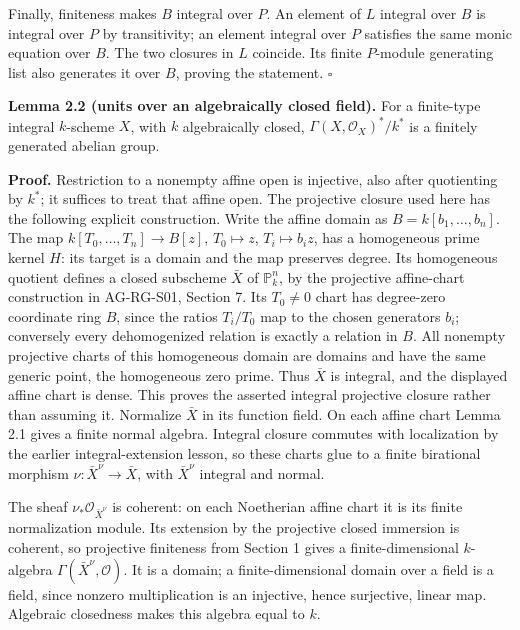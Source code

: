 \documentclass[11pt,a4paper,openany]{report}
\newcounter{none}
\begin{document}
Finally, finiteness makes \(B\) integral over \(P\). An element of \(L\) integral over \(B\) is integral over \(P\) by transitivity; an element integral over \(P\) satisfies the same monic equation over \(B\). The two closures in \(L\) coincide. Its finite \(P\)-module generating list also generates it over \(B\), proving the statement. \(\square\)

\textbf{Lemma 2.2 (units over an algebraically closed field).} For a finite-type integral \(k\)-scheme \(X\), with \(k\) algebraically closed, \(\Gamma(X,\mathcal O_X)^*/k^*\) is a finitely generated abelian group.

\textbf{Proof.} Restriction to a nonempty affine open is injective, also after quotienting by \(k^*\); it suffices to treat that affine open. The projective closure used here has the following explicit construction. Write the affine domain as \(B=k[b_1,\ldots,b_n]\). The map \(k[T_0,\ldots,T_n]\to B[z]\), \(T_0\mapsto z\), \(T_i\mapsto b_i z\), has a homogeneous prime kernel \(H\): its target is a domain and the map preserves degree. Its homogeneous quotient defines a closed subscheme \(\bar X\) of \(\mathbb P^n_k\), by the projective affine-chart construction in AG-RG-S01, Section 7. Its \(T_0\ne0\) chart has degree-zero coordinate ring \(B\), since the ratios \(T_i/T_0\) map to the chosen generators \(b_i\); conversely every dehomogenized relation is exactly a relation in \(B\). All nonempty projective charts of this homogeneous domain are domains and have the same generic point, the homogeneous zero prime. Thus \(\bar X\) is integral, and the displayed affine chart is dense. This proves the asserted integral projective closure rather than assuming it. Normalize \(\bar X\) in its function field. On each affine chart Lemma 2.1 gives a finite normal algebra. Integral closure commutes with localization by the earlier integral-extension lesson, so these charts glue to a finite birational morphism \(\nu:\bar X^\nu\to\bar X\), with \(\bar X^\nu\) integral and normal.

The sheaf \(\nu_*\mathcal O_{\bar X^\nu}\) is coherent: on each Noetherian affine chart it is its finite normalization module. Its extension by the projective closed immersion is coherent, so projective finiteness from Section 1 gives a finite-dimensional \(k\)-algebra \(\Gamma(\bar X^\nu,\mathcal O)\). It is a domain; a finite-dimensional domain over a field is a field, since nonzero multiplication is an injective, hence surjective, linear map. Algebraic closedness makes this algebra equal to \(k\).
\end{document}
